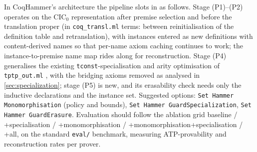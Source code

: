 \begin{remark}
\label{rem:implementation}
In CoqHammer's architecture the pipeline slots in as follows.
Stage (P1)--(P2) operates on the $\mathrm{CIC}_0$ representation
after premise selection and before the translation proper (in
\texttt{coq\_transl.ml} terms: between reinitialisation of the
definition table and retranslation), with instances entered as new
definitions with content-derived names so that per-name axiom
caching continues to work; the instance-to-premise name map rides
along for reconstruction.  Stage (P4) generalises the existing
\texttt{tconst}-specialisation and arity optimisation of
\texttt{tptp\_out.ml} \cite[\S5.5]{CzajkaKaliszyk2018}, with the
bridging axioms removed as analysed in \cref{sec:specialization};
stage (P5) is new, and its erasability check needs only the
inductive declarations and the instance set.  Suggested options:
\texttt{Set Hammer Monomorphisation} (policy and bounds),
\texttt{Set Hammer GuardSpecialization}, \texttt{Set Hammer
GuardErasure}.  Evaluation should follow the ablation grid
baseline / +specialisation / +monomorphisation /
+monomorphisation+specialisation / +all, on the standard
\texttt{eval/} benchmark, measuring ATP-provability and
reconstruction rates per prover.
\end{remark}

